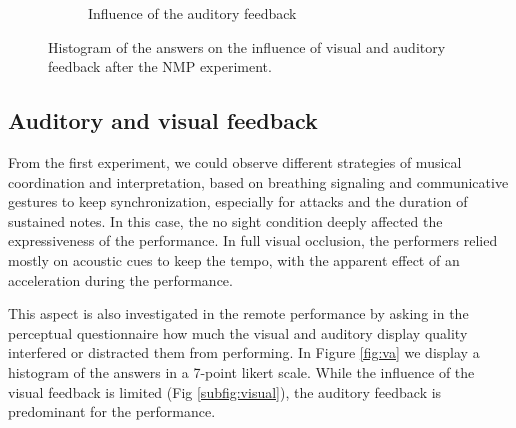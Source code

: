 \begin{figure}[t]
\begin{subfigure}[t]{.48\columnwidth}
		\caption{Influence of the auditory feedback}
		\label{subfig:involvement}
	\end{subfigure}
	\quad 
	\caption{Histogram of the answers on the influence of visual and auditory feedback after the NMP experiment.}\label{fig:ca}
\end{figure}  


\subsection{Auditory and visual feedback}
From the first experiment, we could observe different strategies of musical coordination and interpretation, based on breathing signaling and communicative gestures to keep synchronization, especially for attacks and the duration of sustained notes. In this case, the no sight condition deeply affected the expressiveness of the performance. In full visual occlusion, the performers relied mostly on acoustic cues to keep the tempo, with the apparent effect of an acceleration during the performance. 

This aspect is also investigated in the remote performance by asking in the perceptual questionnaire how much the visual and auditory display quality interfered or distracted them from performing. In Figure \ref{fig:va} we display a histogram of the answers in a 7-point likert scale. While the influence of the visual feedback is limited (Fig \ref{subfig:visual}), the auditory feedback is predominant for the performance.
  
